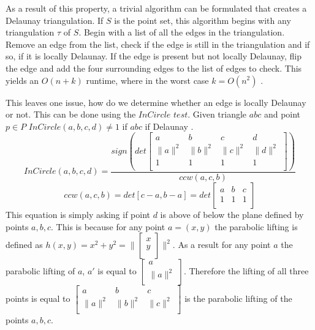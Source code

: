 \documentclass[11pt]{article}
\begin{document}
As a result of this property, a trivial algorithm can be formulated that creates a Delaunay triangulation. If $S$ is the point set, this algorithm begins with any triangulation $\tau$ of $S$. Begin with a list of all the edges in the triangulation. Remove an edge from the list, check if the edge is still in the triangulation and if so, if it is locally Delaunay. If the edge is present but not locally Delaunay, flip the edge and add the four surrounding edges to the list of edges to check. This yields an $O(n + k)$ runtime, where in the worst case $k = O(n^2)$ \cite{meshGeneration}.

This leaves one issue, how do we determine whether an edge is locally Delaunay or not. This can be done using the $InCircle$ $test$. Given triangle $abc$ and point $p \in P$ $InCircle(a,b,c,d) \neq 1$ if $abc$ if Delaunay \cite{princeton:CCW}. 
	\begin{equation}
		InCircle(a,b,c,d) = \frac{sign(det
		\begin{bmatrix}
    			a & b & c & d \\
    			\|a\|^2 & \|b\|^2 & \|c\|^2 & \|d\|^2 \\
    			1 & 1 & 1 & 1 \\
		\end{bmatrix} 
		)}{ccw(a,c,b)}
	\end{equation}
	\begin{equation}
		ccw(a,c,b) = det[c-a,b-a] = det
		\begin{bmatrix}
    			a & b & c \\
    			1 & 1 & 1\\
		\end{bmatrix} 
	\end{equation} 
	This equation is simply asking if point $d$ is above of below the plane defined by points $a,b,c$. This is because for any point $a = (x,y)$ the parabolic lifting is defined as $h(x,y) = x^2 + y^2 = \| 
	\begin{bmatrix} 
		x \\
		y \\ 
	\end{bmatrix} 
	\|^2$.
	As a result for any point $a$ the parabolic lifting of $a$, $a'$ is equal to $
	\begin{bmatrix} 
		a \\ 
		\| a \|^2 \\ 
	\end{bmatrix}$. 
	Therefore the lifting of all three points is equal to
	$\begin{bmatrix}
    			a & b & c \\
    			\|a\|^2 & \|b\|^2 & \|c\|^2 \\
	\end{bmatrix}$ 
	is the parabolic lifting of the points $a,b,c$.
\end{document}
